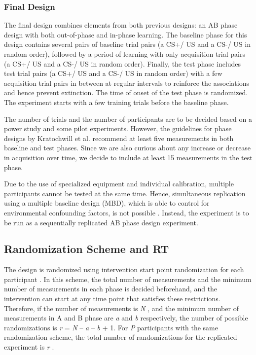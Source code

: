 \documentclass{article}
\begin{document}
\subsubsection{Final Design} 

The final design combines elements from both previous designs: an AB phase design with both out-of-phase and in-phase learning. The baseline phase for this design contains several pairs of baseline trial pairs (a CS+/ US  and a CS-/ US  in random order), followed by a period of learning with only acquisition trial pairs (a CS+/ US  and a CS-/ US  in random order). Finally, the test phase includes test trial pairs (a CS+/ US  and a CS-/ US  in random order) with a few acquisition trial pairs in between at regular intervals to reinforce the associations and hence prevent extinction. The time of onset of the test phase is randomized. The experiment starts with a few training trials before the baseline phase. 

The number of trials and the number of participants are to be decided based on a power study and some pilot experiments. However, the guidelines for phase designs by Kratochwill et al. \autocite{bib26} recommend at least five measurements in both baseline and test phases. Since we are also curious about any increase or decrease in acquisition over time, we decide to include at least 15 measurements in the test phase. 

Due to the use of specialized equipment and individual calibration, multiple participants cannot be tested at the same time. Hence, simultaneous replication using a multiple baseline design (MBD), which is able to control for environmental confounding factors, is not possible \autocite{bib9,bib10} . Instead, the experiment is to be run as a sequentially replicated AB phase design experiment. 

\subsection{Randomization Scheme and RT} 

The design is randomized using intervention start point randomization for each participant \autocite{bib14} . In this scheme, the total number of measurements and the minimum number of measurements in each phase is decided beforehand, and the intervention can start at any time point that satisfies these restrictions. Therefore, if the number of measurements is \emph{N} , and the minimum number of measurements in A and B phase are \emph{a} and \emph{b} respectively, the number of possible randomizations is \emph{r} = \emph{N} -- \emph{a} -- \emph{b} + 1. For \emph{P} participants with the same randomization scheme, the total number of randomizations for the replicated experiment is \emph{r} . 
\end{document}
